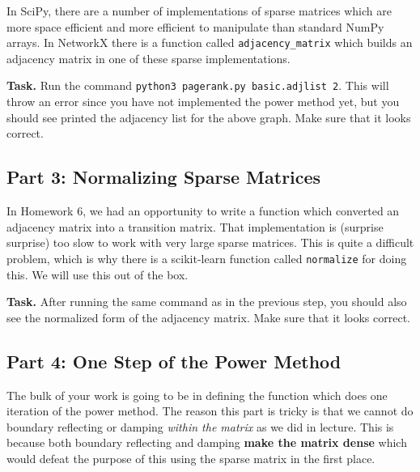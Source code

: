 \documentclass{article}
\theoremstyle{remark}
\begin{document}
In SciPy, there are a number of implementations of sparse matrices which are more space efficient and more efficient to manipulate than standard NumPy arrays.
In NetworkX there is a function called \texttt{adjacency\_matrix} which builds an adjacency matrix in one of these sparse implementations.

\smallskip
\noindent
\textbf{Task.}
Run the command \texttt{python3 pagerank.py basic.adjlist 2}.
This will throw an error since you have not implemented the power method yet, but you should see printed the adjacency list for the above graph. Make sure that it looks correct.

\subsection*{Part 3: Normalizing Sparse Matrices}

In Homework 6, we had an opportunity to write a function which converted an adjacency matrix into a transition matrix.
That implementation is (surprise surprise) too slow to work with very large sparse matrices.
This is quite a difficult problem, which is why there is a scikit-learn function called \texttt{normalize} for doing this.
We will use this out of the box.

\smallskip
\noindent
\textbf{Task.} After running the same command as in the previous step, you should also see the normalized form of the adjacency matrix. Make sure that it looks correct.

\subsection*{Part 4: One Step of the Power Method}

The bulk of your work is going to be in defining the function which does one iteration of the power method.
The reason this part is tricky is that we cannot do boundary reflecting or damping \textit{within the matrix} as we did in lecture.
This is because both boundary reflecting and damping \textbf{make the matrix dense} which would defeat the purpose of this using the sparse matrix in the first place.
\end{document}
